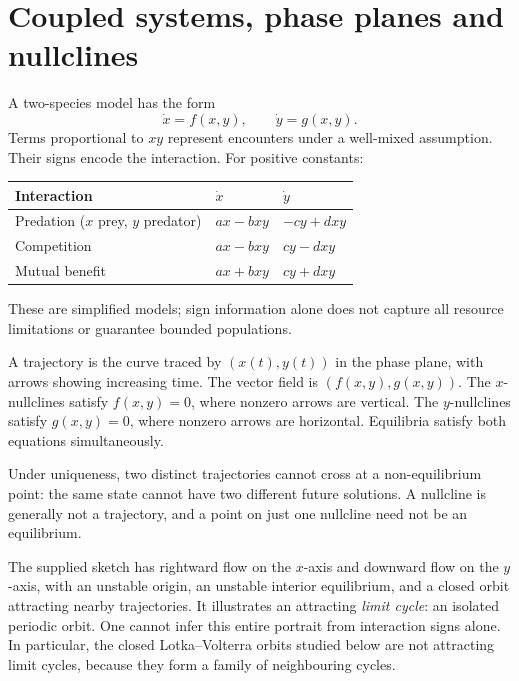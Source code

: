 \section{Coupled systems, phase planes and nullclines}
A two-species model has the form
\[
\dot x=f(x,y),\qquad\dot y=g(x,y).
\]
Terms proportional to $xy$ represent encounters under a well-mixed
assumption. Their signs encode the interaction. For positive constants:
\begin{center}
\begin{tabular}{lll}
\toprule
Interaction&$\dot x$&$\dot y$\\\midrule
Predation ($x$ prey, $y$ predator)&$ax-bxy$&$-cy+dxy$\\
Competition&$ax-bxy$&$cy-dxy$\\
Mutual benefit&$ax+bxy$&$cy+dxy$\\\bottomrule
\end{tabular}
\end{center}
These are simplified models; sign information alone does not capture all
resource limitations or guarantee bounded populations.

\begin{definition}
A trajectory is the curve traced by $(x(t),y(t))$ in the phase plane,
with arrows showing increasing time. The vector field is $(f(x,y),g(x,y))$.
The $x$-nullclines satisfy $f(x,y)=0$, where nonzero arrows are vertical.
The $y$-nullclines satisfy $g(x,y)=0$, where nonzero arrows are horizontal.
Equilibria satisfy both equations simultaneously.
\end{definition}
Under uniqueness, two distinct trajectories cannot cross at a non-equilibrium
point: the same state cannot have two different future solutions.
A nullcline is generally not a trajectory, and a point on just one
nullcline need not be an equilibrium.

\begin{example}
The supplied sketch has rightward flow on the $x$-axis and downward flow
on the $y$-axis, with an unstable origin, an unstable interior equilibrium,
and a closed orbit attracting nearby trajectories. It illustrates an
attracting \emph{limit cycle}: an isolated periodic orbit.
One cannot infer this entire portrait from interaction signs alone.
In particular, the closed Lotka--Volterra orbits studied below are not
attracting limit cycles, because they form a family of neighbouring cycles.
\end{example}

